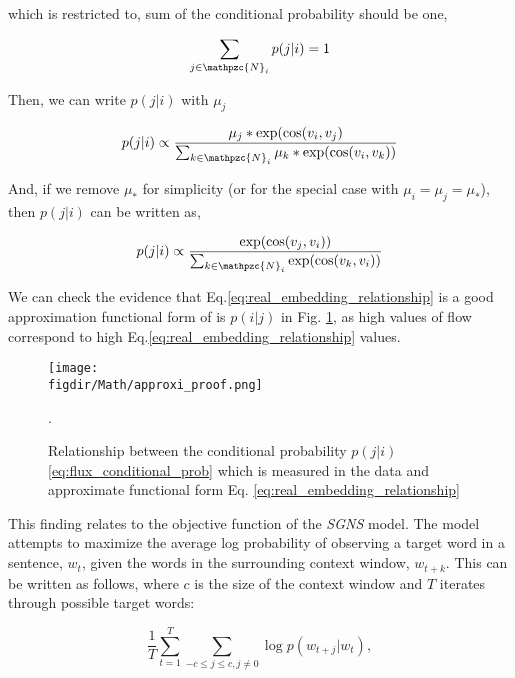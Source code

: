 \documentclass[12pt]{article} %
\def\figdir{../Figs}
\def\SGNS{\textit{SGNS}}
\begin{document}
which is restricted to, sum of the conditional probability should be one,

\begin{equation}
    \label{eq:sum of the conditional probabiitliy}
    \sum_{j\in\mathpzc{N}_i} p(j|i) = 1
\end{equation}

Then, we can write $p(j|i)$ with $\mu_{j}$

\begin{equation}
    p(j|i) \propto \frac{{\mu_j}* \exp(\cos(v_i,v_j)}{\sum_{k\in\mathpzc{N}_i} {\mu_k}* \exp(\cos(v_i,v_k))}
\end{equation}

And, if we remove ${\mu_*}$ for simplicity (or for the special case with $\mu_{i} = \mu_{j} = \mu_*$), then $p(j|i)$ can be written as,

\begin{equation}
    \label{eq:real_embedding_relationship}
    p(j|i) \propto \frac{\exp(\cos(v_j, v_i))}{\sum_{k\in\mathpzc{N}_i} \exp(\cos(v_k,v_i))}
\end{equation}

We can check the evidence that Eq.\ref{eq:real_embedding_relationship} is a good approximation functional form of is $p(i|j)$ in Fig. \ref{fig:real_embedding_relationship}, as high values of flow correspond to high Eq.\ref{eq:real_embedding_relationship} values.

%
%
\begin{figure}
    \centering
    \texttt{[image: \\figdir/Math/approxi\_proof.png]}
    \caption{Relationship between the conditional probability $p(j|i)$ \ref{eq:flux_conditional_prob} which is measured in the data and approximate functional form Eq. \ref{eq:real_embedding_relationship}}.
    \label{fig:real_embedding_relationship}
\end{figure}

This finding relates to the objective function of the \SGNS{} model. The model attempts to maximize the average log probability of observing a target word in a sentence, $w_{t}$, given the words in the surrounding context window, $w_{t + k}$. This can be written as follows, where $c$ is the size of the context window and $T$ iterates through possible target words:

\begin{equation}
    \label{eq:skipgram_log_prob_condensed}
    \frac{1}{T}\sum_{t=1}^{T} \sum_{-c \le j \le c, j \neq 0} \log p(w_{t+j}|w_t),  
\end{equation}
\end{document}
